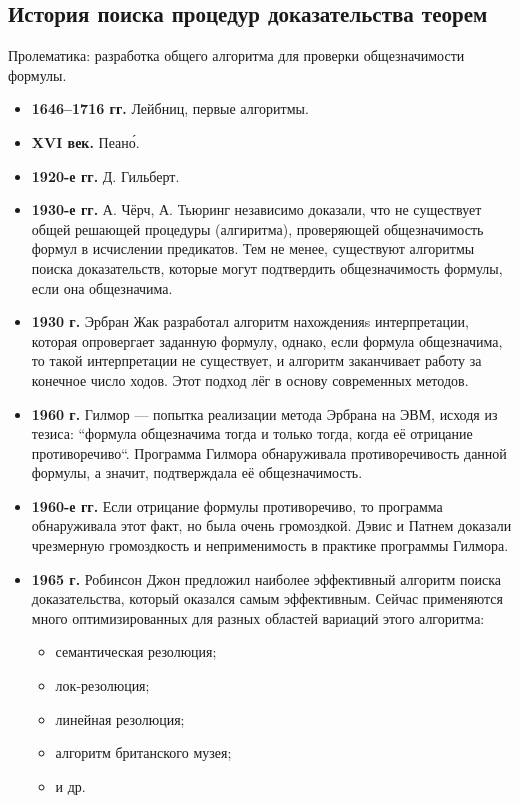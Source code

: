 \documentclass[a4paper,12pt]{report}
\begin{document}
\subsection{История поиска процедур доказательства теорем}

	Пролематика: разработка общего алгоритма для проверки общезначимости формулы.
	\begin{itemize}
		\item \textbf{1646–1716 гг.} Лейбниц, первые алгоритмы.
		\item \textbf{XVI век.} Пеано́.
		\item \textbf{1920-е гг.} Д. Гильберт.
		\item \textbf{1930-е гг.} А. Чёрч, А. Тьюринг независимо доказали, что не
			существует общей решающей процедуры (алгиритма), проверяющей
			общезначимость формул в исчислении предикатов. Тем не менее, существуют
			алгоритмы поиска доказательств, которые могут подтвердить общезначимость
			формулы, если она общезначима.
		\item \textbf{1930 г.} Эрбран Жак разработал алгоритм нахожденияs
			интерпретации, которая опровергает заданную формулу, однако, если формула
			общезначима, то такой интерпретации не существует, и алгоритм заканчивает
			работу за конечное число ходов. Этот подход лёг в основу современных
			методов.
		\item \textbf{1960 г.} Гилмор — попытка реализации метода Эрбрана на ЭВМ,
			исходя из тезиса: ``формула общезначима тогда и только тогда, когда её
			отрицание противоречиво``. Программа Гилмора обнаруживала
			противоречивость данной формулы, а значит, подтверждала её
			общезначимость.
		\item \textbf{1960-е гг.} Если отрицание формулы противоречиво, то
			программа обнаруживала этот факт, но была очень громоздкой. Дэвис и
			Патнем доказали чрезмерную громоздкость и неприменимость в практике
			программы Гилмора.
		\item \textbf{1965 г.} Робинсон Джон предложил наиболее эффективный
			алгоритм поиска доказательства, который оказался самым эффективным.
			Сейчас применяются много оптимизированных для разных областей вариаций
			этого алгоритма:
			\begin{itemize}
				\item семантическая резолюция;
				\item лок-резолюция;
				\item линейная резолюция;
				\item алгоритм британского музея;
				\item и др.
			\end{itemize}
	\end{itemize}
\end{document}
